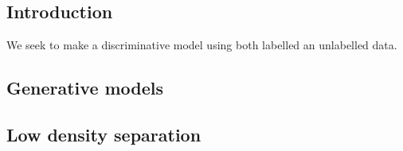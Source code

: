 
\subsection{Introduction}

We seek to make a discriminative model using both labelled an unlabelled data.



\subsection{Generative models}


\subsection{Low density separation}

